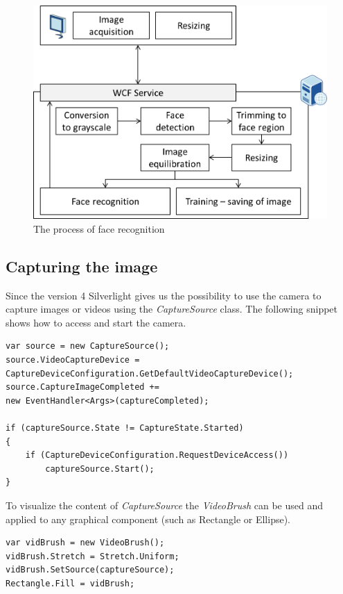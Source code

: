 \begin{figure}[h]
\begin{center}
\includegraphics[width=14cm]{figures/face_recognition}
\caption{The process of face recognition}
\label{fig:face_recognition}
\end{center}
\end{figure}

\subsection{Capturing the image}
Since the version 4 Silverlight gives us the possibility to use the camera to capture images or videos using the \textit{CaptureSource} class. The following snippet shows how to access and start the camera.
\begin{verbatim}
var source = new CaptureSource();
source.VideoCaptureDevice = 
CaptureDeviceConfiguration.GetDefaultVideoCaptureDevice();
source.CaptureImageCompleted += 
new EventHandler<Args>(captureCompleted);

if (captureSource.State != CaptureState.Started)
{   
    if (CaptureDeviceConfiguration.RequestDeviceAccess())
        captureSource.Start();
}	
\end{verbatim}
To visualize the content of \textit{CaptureSource} the \textit{VideoBrush} can be used and applied to any graphical component (such as Rectangle or Ellipse).

\begin{verbatim}
var vidBrush = new VideoBrush();
vidBrush.Stretch = Stretch.Uniform;
vidBrush.SetSource(captureSource);
Rectangle.Fill = vidBrush;	
\end{verbatim}

